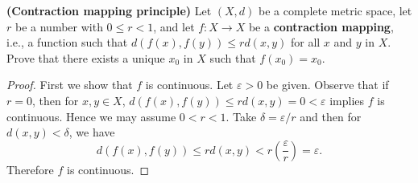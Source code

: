 \documentclass[12pt]{amsart}
\begin{document}
\begin{setup}
  {\bf (Contraction mapping principle)} Let $(X,d)$ be a complete metric space, let $r$ be a number with $0 \leq r < 1$, and let $f \colon X \rightarrow X$ be a {\bf contraction mapping}, i.e., a function such that $d(f(x), f(y)) \leq rd(x,y)$ for all $x$ and $y$ in $X$.
  Prove that there exists a unique $x_0$ in $X$ such that $f(x_0) = x_0$.
  
  \begin{proof}
    First we show that $f$ is continuous.
    Let $\varepsilon > 0$ be given.
    Observe that if $r = 0$, then for $x,y \in X$, $d(f(x),f(y)) \leq rd(x,y) = 0 < \varepsilon$ implies $f$ is continuous.
    Hence we may assume $0 < r < 1$.
    Take $\delta = \varepsilon/r$ and then for $d(x,y) < \delta$, we have $$d(f(x), f(y)) \leq rd(x,y) < r\left(\frac{\varepsilon}{r}\right) = \varepsilon.$$
    Therefore $f$ is continuous.
    

\end{proof}
\end{setup}
\end{document}
